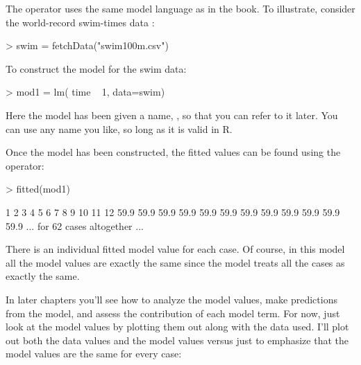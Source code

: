 The  operator uses the same model language as in the
book. To illustrate, consider the world-record swim-times data :
\begin{Schunk}
\begin{Sinput}
> swim = fetchData("swim100m.csv")
\end{Sinput}
\end{Schunk}

To construct the model  for the swim data:
\begin{Schunk}
\begin{Sinput}
> mod1 = lm( time ~ 1, data=swim)
\end{Sinput}
\end{Schunk}
Here the model has been given a name, , so that you can
refer to it later.  You can use any name you like, so long as it is valid in R.

\datasetSwimming



Once the model has been constructed, the fitted values can be found
using the  operator:
\begin{Schunk}
\begin{Sinput}
> fitted(mod1)
\end{Sinput}
\end{Schunk}
\begin{Schunk}
\begin{Soutput}
   1    2    3    4    5    6    7    8    9   10   11   12 
59.9 59.9 59.9 59.9 59.9 59.9 59.9 59.9 59.9 59.9 59.9 59.9 
... for 62 cases altogether ...
\end{Soutput}
\end{Schunk}

There is an individual fitted model value for each case.
Of course, in this model all the model values are exactly the same
since the model  treats all the cases as
exactly the same.

In later chapters you'll see how to analyze the model values, make 
predictions from the model, and
assess the contribution of each model term.  For now, just look at the model
values by plotting them out along with the data used.  I'll plot out
both the data values and the model values versus  just to
emphasize that the model values are the same for every case:

